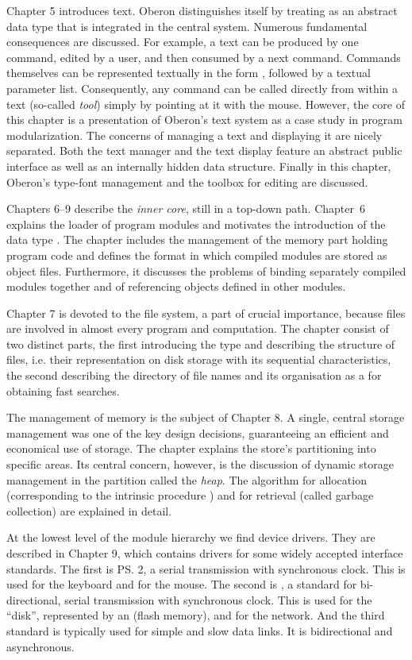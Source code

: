 Chapter 5 introduces text. Oberon distinguishes itself by treating
 as an abstract data type that is integrated in the central
system. Numerous fundamental consequences are discussed. For example,
a text can be produced by one command, edited by a user, and then
consumed by a next command. Commands themselves can be represented
textually in the form , followed by a textual parameter
list. Consequently, any command can be called directly from within a
text (so-called \emph{tool}) simply by pointing at it with the
mouse. However, the core of this chapter is a presentation of Oberon's
text system as a case study in program modularization. The concerns of
managing a text and displaying it are nicely separated. Both the text
manager and the text display feature an abstract public interface as
well as an internally hidden data structure. Finally in this chapter,
Oberon's type-font management and the toolbox for editing are
discussed.

Chapters 6--9 describe the \emph{inner core}, still in a top-down
path. Chapter~6 explains the loader of program modules and motivates
the introduction of the data type . The chapter includes the
management of the memory part holding program code and defines the
format in which compiled modules are stored as object
files. Furthermore, it discusses the problems of binding separately
compiled modules together and of referencing objects defined in other
modules.

Chapter 7 is devoted to the file system, a part of crucial importance,
because files are involved in almost every program and
computation. The chapter consist of two distinct parts, the first
introducing the type  and describing the structure of files,
i.e. their representation on disk storage with its sequential
characteristics, the second describing the directory of file names and
its organisation as a \btree for obtaining fast searches.

The management of memory is the subject of Chapter 8. A single,
central storage management was one of the key design decisions,
guaranteeing an efficient and economical use of storage. The chapter
explains the store's partitioning into specific areas. Its central
concern, however, is the discussion of dynamic storage management in
the partition called the \emph{heap}. The algorithm for allocation
(corresponding to the intrinsic procedure ) and for retrieval
(called garbage collection) are explained in detail.

At the lowest level of the module hierarchy we find device
drivers. They are described in Chapter 9, which contains drivers for
some widely accepted interface standards. The first is \ps2, a serial
transmission with synchronous clock. This is used for the keyboard and
for the mouse. The second is , a standard for bi-directional,
serial transmission with synchronous clock. This is used for the
``disk'', represented by an \sdcard (flash memory), and for the
network. And the third standard is  typically used for simple
and slow data links. It is bidirectional and asynchronous.

